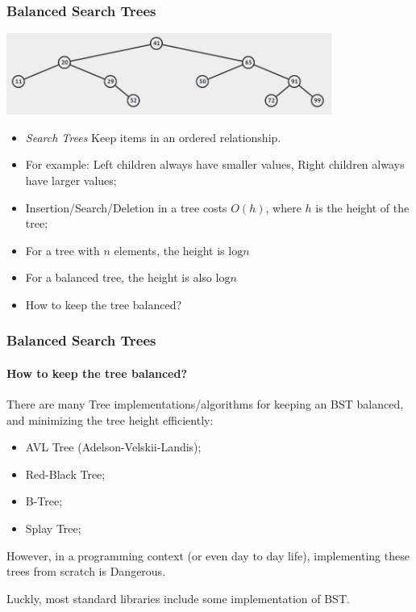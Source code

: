 \documentclass{beamer}
\begin{document}
\begin{frame}
  \frametitle{Balanced Search Trees}
  \begin{center}
    \includegraphics[width=0.8\textwidth]{img/BST}
  \end{center}
  \begin{itemize}
  \item \emph{Search Trees} Keep items in an ordered relationship.
  \item For example: Left children always have smaller values, Right
    children always have larger values;
  \item Insertion/Search/Deletion in a tree costs $O(h)$, where $h$ is
    the height of the tree;
  \item For a tree with $n$ elements, the  height
    is $\text{log}n$
  \item For a balanced tree, the  height is also
    $\text{log}n$
  \item How to keep the tree balanced?
  \end{itemize}
\end{frame}

\begin{frame}
  \frametitle{Balanced Search Trees}
  \framesubtitle{How to keep the tree balanced?}

  There are many Tree implementations/algorithms for keeping an BST
  balanced, and minimizing the tree height efficiently:
  \begin{itemize}
  \item AVL Tree (Adelson-Velskii-Landis);
  \item Red-Black Tree;
  \item B-Tree;
  \item Splay Tree;
  \end{itemize}
  \bigskip

  However, in a programming context (or even day to day life),
  implementing these trees from scratch is \alert{Dangerous}.

  \bigskip

  Luckly, most standard libraries include some implementation of BST.
\end{frame}
\end{document}
